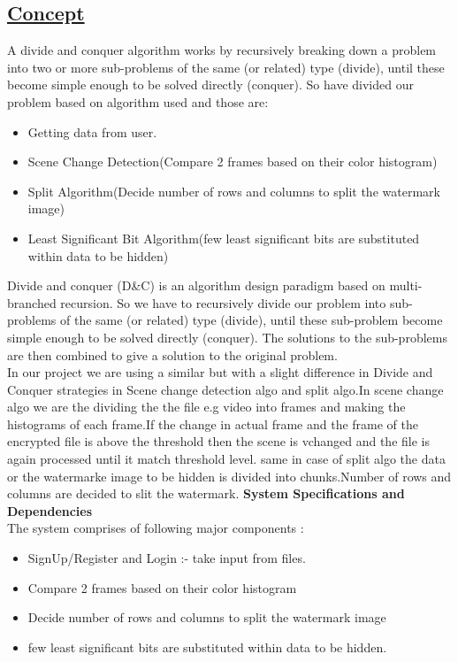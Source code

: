 \subsection*{\underline{Concept}}
A divide and conquer algorithm works by recursively breaking down a problem into two or more sub-problems of the same (or related) type (divide), until these become simple enough to be solved directly (conquer). So have divided our problem based on algorithm used and those are:
\begin{itemize}
\item Getting data from user.
\item Scene Change Detection(Compare 2 frames based on their color histogram)
\item Split Algorithm(Decide number of rows and columns to split the watermark image)
\item Least Significant Bit Algorithm(few least significant bits are substituted within data to be hidden)
\end{itemize}

\vspace*{0.4cm}
\noindent
\hspace{5em}Divide and conquer (D\&C) is an algorithm design paradigm based on multi-branched recursion. So we have to recursively divide our problem into  sub-problems  of the same (or related) type (divide), until these sub-problem become simple enough to be solved directly (conquer). The solutions to the sub-problems are then combined to give a solution to the original problem.\\

\noindent
\hspace{5em}In our project we are using a similar but with a slight difference in Divide and Conquer strategies in Scene change detection algo and split algo.In scene change algo we are the dividing the the file e.g video into frames and making the histograms of each frame.If the change in actual frame and the frame of the encrypted file is above the threshold then the scene is vchanged and the file is again processed until it match threshold level.
        same in case of split algo the data or the watermarke image to be hidden is divided into chunks.Number of rows and columns are decided to slit the watermark.
\newpage
\noindent
\textbf{System Specifications and Dependencies}\\
The system comprises of following major components : 
\begin{itemize}


\item SignUp/Register and Login :- take input from files.
\item Compare 2 frames based on their color histogram
\item Decide number of rows and columns to split the watermark image
\item few least significant bits are substituted within data to be hidden.
\end{itemize}

